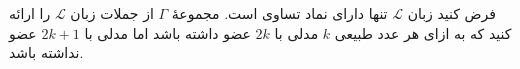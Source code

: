 فرض کنید زبان
$\mathcal{L}$
تنها دارای نماد تساوی است. مجموعهٔ $\Gamma$ از جملات زبان $\mathcal{L}$ را ارائه کنید که به ازای هر عدد طبیعی $k$ مدلی با $2k$ عضو داشته باشد اما مدلی با $2k+1$ عضو نداشته باشد.
